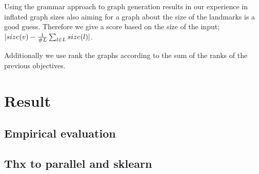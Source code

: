 \documentclass{esannV2}
\begin{document}
Using the grammar approach to graph generation results in our experience in 
inflated graph sizes also aiming for a graph about the size of the landmarks is a good guess.
Therefore we give a score based on the size of the input; $|size(v) - {1\over{\#L}} \sum_{l \in L} size(l)|$.

Additionally we use rank the graphs according to the sum of the ranks of the previous objectives.

\section{Result}

\subsection{Empirical evaluation}




\subsection*{Thx to parallel and sklearn}




\end{document}
